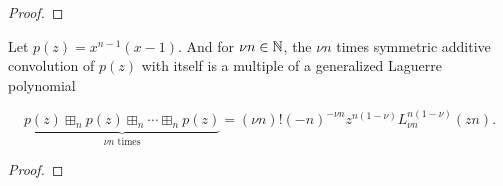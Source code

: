 \begin{proof}
    
\end{proof}


\begin{theorem}
    Let $p(z) = x^{n-1}(x-1)$. And for $\nu n \in \mathbb N$, the $\nu n$ times symmetric additive convolution of $p(z)$ with itself is a multiple of a generalized Laguerre polynomial

    \begin{equation*}
        \underbrace{p(z) \boxplus_n p(z) \boxplus_n \cdots \boxplus_n p(z)}_\text{$\nu n$ times} = (\nu n)!(-n)^{-\nu n}z^{n(1-\nu)}L_{\nu n}^{n(1-\nu)}(zn).
    \end{equation*}
\end{theorem}

\begin{proof}
    
\end{proof}